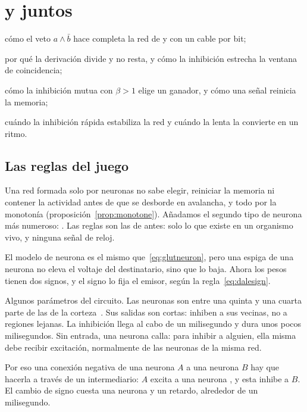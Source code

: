 \chapter{ y  juntos}
\label{sec:gaba}
\begin{chaptergoals}
\item cómo el veto $a\wedge\bar b$ hace completa la red de  y  con un cable por bit;
\item por qué la derivación divide y no resta, y cómo la inhibición estrecha la ventana de coincidencia;
\item cómo la inhibición mutua con $\beta>1$ elige un ganador, y cómo una señal reinicia la memoria;
\item cuándo la inhibición rápida estabiliza la red y cuándo la lenta la convierte en un ritmo.
\end{chaptergoals}

\section{Las reglas del juego}

Una red formada solo por neuronas  no sabe elegir, reiniciar la memoria ni contener la actividad antes de que se desborde en avalancha, y todo por la monotonía (proposición~\ref{prop:monotone}). Añadamos el segundo tipo de neurona más numeroso: . Las reglas son las de antes: solo lo que existe en un organismo vivo, y ninguna señal de reloj.

El modelo de neurona es el mismo que~\eqref{eq:glutneuron}, pero una espiga de una neurona  no eleva el voltaje del destinatario, sino que lo baja. Ahora los pesos tienen dos signos, y el signo lo fija el emisor, según la regla~\eqref{eq:dalesign}.

Algunos parámetros del circuito. Las neuronas  son entre una quinta y una cuarta parte de las de la corteza~\cite{Hendry1987}. Sus salidas son cortas: inhiben a sus vecinas, no a regiones lejanas. La inhibición llega al cabo de un milisegundo y dura unos pocos milisegundos. Sin entrada, una neurona  calla: para inhibir a alguien, ella misma debe recibir excitación, normalmente de las neuronas  de la misma red.

Por eso una conexión negativa de una neurona  $A$ a una neurona $B$ hay que hacerla a través de un intermediario: $A$ excita a una neurona , y esta inhibe a $B$. El cambio de signo cuesta una neurona y un retardo, alrededor de un milisegundo.

